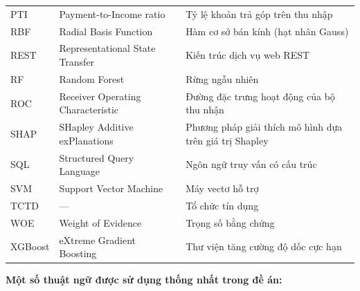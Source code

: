 \begin{longtable}{@{}L{2.2cm}L{5.0cm}L{6.6cm}@{}}
PTI   & Payment-to-Income ratio & Tỷ lệ khoản trả góp trên thu nhập \\
RBF   & Radial Basis Function & Hàm cơ sở bán kính (hạt nhân Gauss) \\
REST  & Representational State Transfer & Kiến trúc dịch vụ web REST \\
RF    & Random Forest & Rừng ngẫu nhiên \\
ROC   & Receiver Operating Characteristic & Đường đặc trưng hoạt động của bộ thu nhận \\
SHAP  & SHapley Additive exPlanations & Phương pháp giải thích mô hình dựa trên giá trị Shapley \\
SQL   & Structured Query Language & Ngôn ngữ truy vấn có cấu trúc \\
SVM   & Support Vector Machine & Máy vectơ hỗ trợ \\
TCTD  & --- & Tổ chức tín dụng \\
WOE   & Weight of Evidence & Trọng số bằng chứng \\
XGBoost & eXtreme Gradient Boosting & Thư viện tăng cường độ dốc cực hạn \\
\end{longtable}
\endgroup

\vspace{0.5cm}
\noindent\textbf{Một số thuật ngữ được sử dụng thống nhất trong đề án:}

